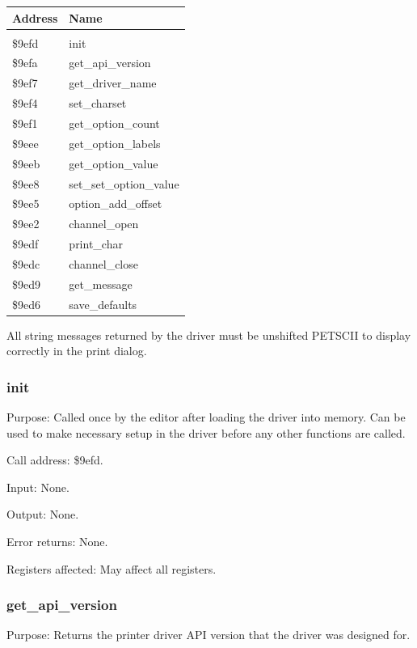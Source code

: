 \documentclass{article}
\begin{document}
        \begin{longtable}[l]{l l}
            \textbf{Address} & \textbf{Name} \\
            \hline \\
            \$9efd & init \\
            \$9efa & get\_api\_version \\
            \$9ef7 & get\_driver\_name \\
            \$9ef4 & set\_charset \\
            \$9ef1 & get\_option\_count \\
            \$9eee & get\_option\_labels \\
            \$9eeb & get\_option\_value \\
            \$9ee8 & set\_set\_option\_value \\
            \$9ee5 & option\_add\_offset \\
            \$9ee2 & channel\_open \\
            \$9edf & print\_char \\
            \$9edc & channel\_close \\            
            \$9ed9 & get\_message \\            
            \$9ed6 & save\_defaults \\
        \end{longtable}

        All string messages returned by the driver must be unshifted PETSCII
        to display correctly in the print dialog.

        \subsubsection{init}
            Purpose: Called once by the editor after loading the
            driver into memory. Can be used to make necessary
            setup in the driver before any other functions are
            called.  
            
            Call address: \$9efd.

            Input: None.
            
            Output: None.
            
            Error returns: None.
            
            Registers affected: May affect all registers.

        \subsubsection{get\_api\_version}
            Purpose: Returns the printer driver API version that
            the driver was designed for.
\end{document}
